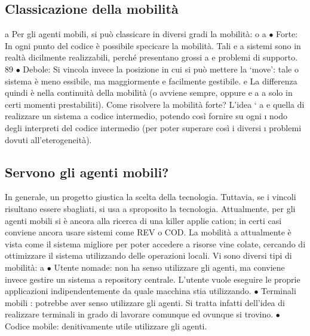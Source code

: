 \documentclass[a4paper,12pt]{article}
\begin{document}
\subsection{Classicazione della mobilità}
a
Per gli agenti mobili, si può classicare in diversi gradi la mobilità:
o
a
$\bullet$ Forte: In ogni punto del codice è possibile specicare la mobilità. Tali
e
a
sistemi sono in realtà dicilmente realizzabili, perché presentano grossi
a
e
problemi di supporto.
89
$\bullet$ Debole: Si vincola invece la posizione in cui si può mettere la {`}move': tale
o
sistema è meno essibile, ma maggiormente e facilmente gestibile.
e
La differenza quindi è nella continuità della mobilità (o avviene sempre, oppure
e
a
a
solo in certi momenti prestabiliti). Come risolvere la mobilità forte? L'idea `
a
e
quella di realizzare un sistema a codice intermedio, potendo così fornire su ogni
\i{}
nodo degli interpreti del codice intermedio (per poter superare così i diversi
\i{}
problemi dovuti all'eterogeneità).
\subsection{Servono gli agenti mobili?}
In generale, un progetto giustica la scelta della tecnologia. Tuttavia, se i vincoli
risultano essere sbagliati, si usa a sproposito la tecnologia.
Attualmente, per gli agenti mobili si è ancora alla ricerca di una killer applie
cation; in certi casi conviene ancora usare sistemi come REV o COD. La mobilità
a
attualmente è vista come il sistema migliore per poter accedere a risorse vine
colate, cercando di ottimizzare il sistema utilizzando delle operazioni locali. Vi
sono diversi tipi di mobilità:
a
$\bullet$ Utente nomade: non ha senso utilizzare gli agenti, ma conviene invece
gestire un sistema a repository centrale. L'utente vuole eseguire le proprie
applicazioni indipendentemente da quale macchina stia utilizzando.
$\bullet$ Terminali mobili : potrebbe aver senso utilizzare gli agenti. Si tratta infatti
dell'idea di realizzare terminali in grado di lavorare comunque ed ovunque
si trovino.
$\bullet$ Codice mobile: denitivamente utile utilizzare gli agenti.
\end{document}
